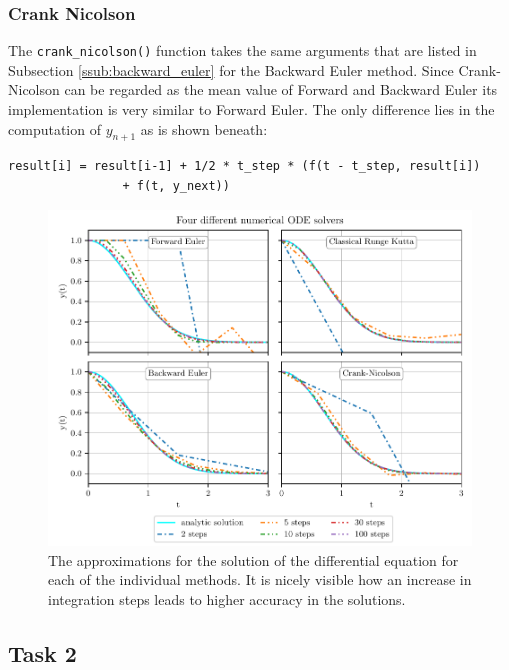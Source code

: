 \documentclass{aa}
\begin{document}
\subsubsection*{Crank Nicolson}%
\label{ssub:crank_nicolson}
The \verb+crank_nicolson()+ function takes the same arguments that are listed in Subsection
\ref{ssub:backward_euler} for the Backward Euler method. Since Crank-Nicolson can be regarded
as the mean value of Forward and Backward Euler its implementation is very similar to Forward
Euler. The only difference lies in the computation of \(y_{n+1}\) as is shown beneath:
\begin{lstlisting}[firstnumber=418, name=ode_solvers]
result[i] = result[i-1] + 1/2 * t_step * (f(t - t_step, result[i])
                + f(t, y_next))
\end{lstlisting}

\begin{figure}[htbp]
    \centering
    \captionsetup{width = 0.9 \textwidth}
    \includegraphics[width=17cm]{../Task_01/ODE_solvers.pdf}
    \caption{The approximations for the solution of the differential equation for each of the
    individual methods. It is nicely visible how an increase in integration steps leads to
    higher accuracy in the solutions.}
    \label{fig:ODE_solvers}
\end{figure}

\subsection{Task 2}%
\label{sub:task_2}
\end{document}

